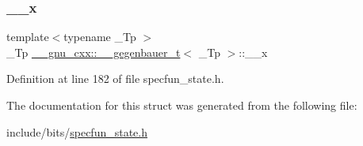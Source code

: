 \subsubsection{\texorpdfstring{\+\_\+\+\_\+x}{\_\_x}}
{\footnotesize\ttfamily template$<$typename \+\_\+\+Tp $>$ \\
\+\_\+\+Tp \hyperlink{struct____gnu__cxx_1_1____gegenbauer__t}{\+\_\+\+\_\+gnu\+\_\+cxx\+::\+\_\+\+\_\+gegenbauer\+\_\+t}$<$ \+\_\+\+Tp $>$\+::\+\_\+\+\_\+x}



Definition at line 182 of file specfun\+\_\+state.\+h.



The documentation for this struct was generated from the following file\+:\begin{DoxyCompactItemize}
\item 
include/bits/\hyperlink{specfun__state_8h}{specfun\+\_\+state.\+h}\end{DoxyCompactItemize}
